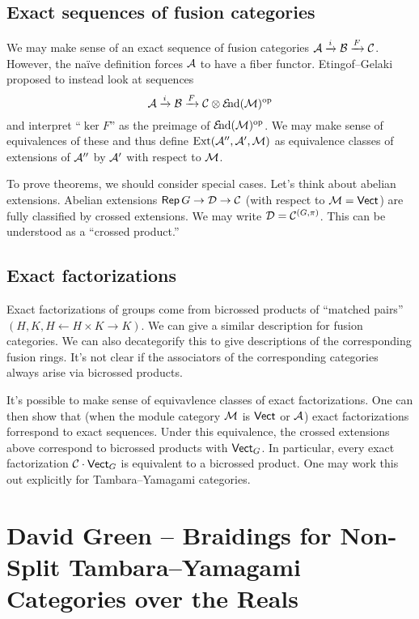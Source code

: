 \documentclass{amsart}
\begin{document}
\subsection{Exact sequences of fusion categories}

We may make sense of an exact sequence of fusion categories $\mathcal{A} \xrightarrow{i} \mathcal{B} \xrightarrow{F} \mathcal{C}$.
However, the na\"ive definition forces $\mathcal{A}$ to have a fiber functor.
Etingof--Gelaki proposed to instead look at sequences
\[
  \mathcal{A} \xrightarrow{i} \mathcal{B} \xrightarrow{F} \mathcal{C} \otimes \operatorname{\mathcal{E}\kern -2pt nd}(\mathcal{M})^{\mathrm{op}}
\]
and interpret ``$\ker F$'' as the preimage of $\operatorname{\mathcal{E}\kern -2pt nd}(\mathcal{M})^{\mathrm{op}}$.
We may make sense of equivalences of these and thus define $\operatorname{Ext}(\mathcal{A}'', \mathcal{A}', \mathcal{M})$ as equivalence classes of extensions of $\mathcal{A}''$ by $\mathcal{A}'$ with respect to $\mathcal{M}$.

To prove theorems, we should consider special cases.
Let's think about abelian extensions.
Abelian extensions $\operatorname{\mathsf{Rep}} G \to \mathcal{D} \to \mathcal{C}$ (with respect to $\mathcal{M} = \mathsf{Vect}$) are fully classified by crossed extensions.
We may write $\mathcal{D} = \mathcal{C}^{(G, \pi)}$.
This can be understood as a ``crossed product.''

\subsection{Exact factorizations}

Exact factorizations of groups come from bicrossed products of ``matched pairs'' $(H, K, H \leftarrow H \times K \to K)$.
We can give a similar description for fusion categories.
We can also decategorify this to give descriptions of the corresponding fusion rings.
It's not clear if the associators of the corresponding categories always arise via bicrossed products.

It's possible to make sense of equivavlence classes of exact factorizations.
One can then show that (when the module category $\mathcal{M}$ is $\mathsf{Vect}$ or $\mathcal{A}$) exact factorizations forrespond to exact sequences.
Under this equivalence, the crossed extensions above correspond to bicrossed products with $\mathsf{Vect}_G$.
In particular, every exact factorization $\mathcal{C} \cdot \mathsf{Vect}_G$ is equivalent to a bicrossed product.
One may work this out explicitly for Tambara--Yamagami categories.

\section{David Green -- Braidings for Non-Split Tambara--Yamagami Categories over the Reals}
\end{document}
